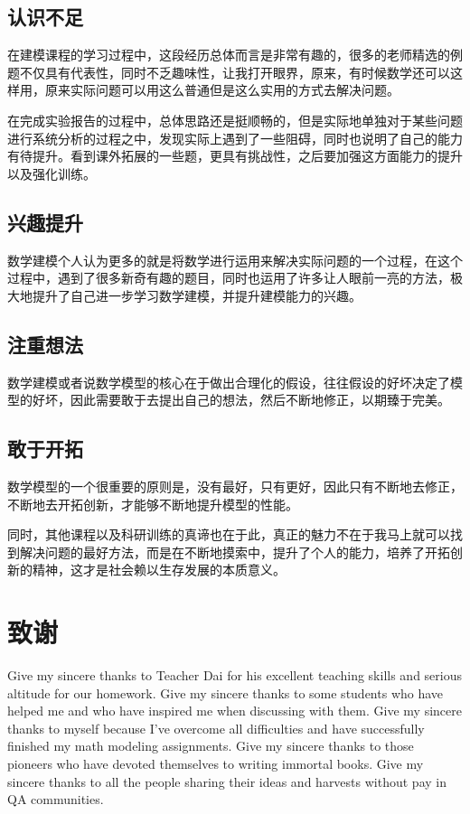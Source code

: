 \documentclass[UTF8]{ctexart}
\begin{document}
   	\subsection{认识不足}
   	在建模课程的学习过程中，这段经历总体而言是非常有趣的，很多的老师精选的例题不仅具有代表性，同时不乏趣味性，让我打开眼界，原来，有时候数学还可以这样用，原来实际问题可以用这么普通但是这么实用的方式去解决问题。

   	在完成实验报告的过程中，总体思路还是挺顺畅的，但是实际地单独对于某些问题进行系统分析的过程之中，发现实际上遇到了一些阻碍，同时也说明了自己的能力有待提升。看到课外拓展的一些题，更具有挑战性，之后要加强这方面能力的提升以及强化训练。

   	\subsection{兴趣提升}
   	数学建模个人认为更多的就是将数学进行运用来解决实际问题的一个过程，在这个过程中，遇到了很多新奇有趣的题目，同时也运用了许多让人眼前一亮的方法，极大地提升了自己进一步学习数学建模，并提升建模能力的兴趣。

   	\subsection{注重想法}
   	数学建模或者说数学模型的核心在于做出合理化的假设，往往假设的好坏决定了模型的好坏，因此需要敢于去提出自己的想法，然后不断地修正，以期臻于完美。

   	\subsection{敢于开拓}
   	数学模型的一个很重要的原则是，没有最好，只有更好，因此只有不断地去修正，不断地去开拓创新，才能够不断地提升模型的性能。

   	同时，其他课程以及科研训练的真谛也在于此，真正的魅力不在于我马上就可以找到解决问题的最好方法，而是在不断地摸索中，提升了个人的能力，培养了开拓创新的精神，这才是社会赖以生存发展的本质意义。

    \section{致谢}
    Give my sincere thanks to Teacher Dai for his excellent teaching skills and serious altitude for our homework. Give my sincere thanks to some students who have helped me and who have inspired me when discussing with them. Give my sincere thanks to myself because I've overcome all difficulties and have successfully finished my math modeling assignments. Give my sincere thanks to those pioneers who have devoted themselves to writing immortal books. Give my sincere thanks to all the people sharing their ideas and harvests without pay in QA communities.
\end{document}
